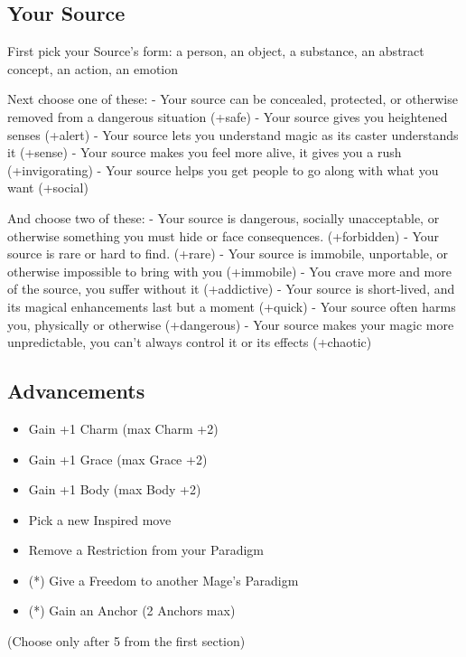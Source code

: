 \documentclass[10pt,twoside,openright]{memoir}
\begin{document}
\hypertarget{your-source}{%
\subsection{Your Source}\label{your-source}}

First pick your Source's form: a person, an object, a substance, an
abstract concept, an action, an emotion

Next choose one of these: - Your source can be concealed, protected, or
otherwise removed from a dangerous situation (+safe) - Your source gives
you heightened senses (+alert) - Your source lets you understand magic
as its caster understands it (+sense) - Your source makes you feel more
alive, it gives you a rush (+invigorating) - Your source helps you get
people to go along with what you want (+social)

And choose two of these: - Your source is dangerous, socially
unacceptable, or otherwise something you must hide or face consequences.
(+forbidden) - Your source is rare or hard to find. (+rare) - Your
source is immobile, unportable, or otherwise impossible to bring with
you (+immobile) - You crave more and more of the source, you suffer
without it (+addictive) - Your source is short-lived, and its magical
enhancements last but a moment (+quick) - Your source often harms you,
physically or otherwise (+dangerous) - Your source makes your magic more
unpredictable, you can't always control it or its effects (+chaotic)

\hypertarget{advancements-3}{%
\subsection{Advancements}\label{advancements-3}}

\begin{itemize}
\tightlist
\item
  Gain +1 Charm (max Charm +2)
\item
  Gain +1 Grace (max Grace +2)
\item
  Gain +1 Body (max Body +2)
\item
  Pick a new Inspired move
\item
  Remove a Restriction from your Paradigm
\item
  (*) Give a Freedom to another Mage's Paradigm
\item
  (*) Gain an Anchor (2 Anchors max)
\end{itemize}

(Choose only after 5 from the first section)
\end{document}
